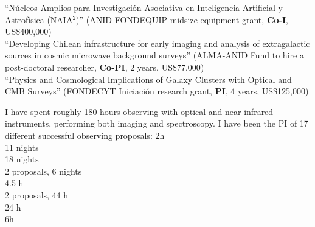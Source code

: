 \documentclass[11pt]{article}
\begin{document}
\hline



\noindent
{} ``Núcleos Amplios para Investigación Asociativa en Inteligencia Artificial y Astrofísica (NAIA$^2$)'' (ANID-FONDEQUIP midsize equipment grant, \textbf{Co-I}, US\$400,000)\\
 ``Developing Chilean infrastructure for early imaging and analysis of
extragalactic sources in cosmic microwave background surveys'' (ALMA-ANID Fund to hire a post-doctoral researcher, \textbf{Co-PI}, 2 years, US\$77,000)\\
 ``Physics and Cosmological Implications of Galaxy Clusters with Optical and CMB Surveys'' (FONDECYT Iniciaci\'on research grant, \textbf{PI}, 4 years, US\$125,000)



\noindent
I have spent roughly 180 hours observing with optical and near infrared instruments, performing both imaging and spectroscopy.
I have been the PI of 17 different successful observing proposals:
%
\noindent
{} 2h\\
 11 nights\\
 18 nights\\
 2 proposals, 6 nights\\
 4.5 h\\
 2 proposals, 44 h\\
 24 h\\
 6h\\



%
\end{document}
